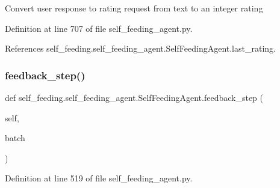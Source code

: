 \begin{DoxyVerb}Convert user response to rating request from text to an integer rating\end{DoxyVerb}
 

Definition at line 707 of file self\+\_\+feeding\+\_\+agent.\+py.



References self\+\_\+feeding.\+self\+\_\+feeding\+\_\+agent.\+Self\+Feeding\+Agent.\+last\+\_\+rating.

\mbox{\label{classself__feeding_1_1self__feeding__agent_1_1SelfFeedingAgent_a7a3807c6692b7a628fa1477d99b73e0b}} 
\subsubsection{\texorpdfstring{feedback\+\_\+step()}{feedback\_step()}}
{\footnotesize\ttfamily def self\+\_\+feeding.\+self\+\_\+feeding\+\_\+agent.\+Self\+Feeding\+Agent.\+feedback\+\_\+step (\begin{DoxyParamCaption}\item[{}]{self,  }\item[{}]{batch }\end{DoxyParamCaption})}



Definition at line 519 of file self\+\_\+feeding\+\_\+agent.\+py.



